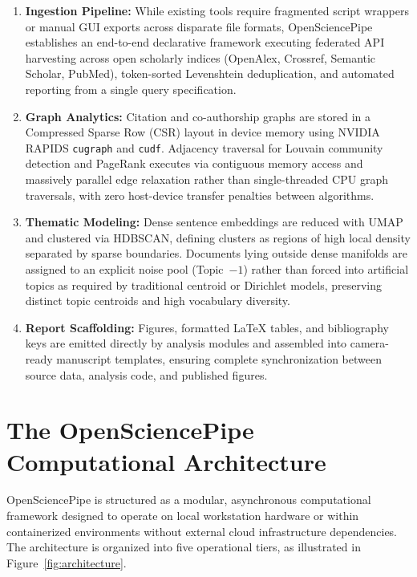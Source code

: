 \documentclass[preprint,12pt]{elsarticle}
\begin{document}
\begin{enumerate}
    \item \textbf{Ingestion Pipeline:} While existing tools require fragmented script wrappers or manual GUI exports across disparate file formats, OpenSciencePipe establishes an end-to-end declarative framework executing federated API harvesting across open scholarly indices (OpenAlex, Crossref, Semantic Scholar, PubMed), token-sorted Levenshtein deduplication, and automated reporting from a single query specification.
    \item \textbf{Graph Analytics:} Citation and co-authorship graphs are stored in a Compressed Sparse Row (CSR) layout in device memory using NVIDIA RAPIDS \texttt{cugraph} and \texttt{cudf}. Adjacency traversal for Louvain community detection and PageRank executes via contiguous memory access and massively parallel edge relaxation rather than single-threaded CPU graph traversals, with zero host-device transfer penalties between algorithms.
    \item \textbf{Thematic Modeling:} Dense sentence embeddings are reduced with UMAP and clustered via HDBSCAN, defining clusters as regions of high local density separated by sparse boundaries. Documents lying outside dense manifolds are assigned to an explicit noise pool (Topic~$-1$) rather than forced into artificial topics as required by traditional centroid or Dirichlet models, preserving distinct topic centroids and high vocabulary diversity.
    \item \textbf{Report Scaffolding:} Figures, formatted \LaTeX{} tables, and bibliography keys are emitted directly by analysis modules and assembled into camera-ready manuscript templates, ensuring complete synchronization between source data, analysis code, and published figures.
\end{enumerate}

\section{The OpenSciencePipe Computational Architecture}
\label{sec:architecture}
OpenSciencePipe is structured as a modular, asynchronous computational framework designed to operate on local workstation hardware or within containerized environments without external cloud infrastructure dependencies. The architecture is organized into five operational tiers, as illustrated in Figure~\ref{fig:architecture}.
\end{document}
